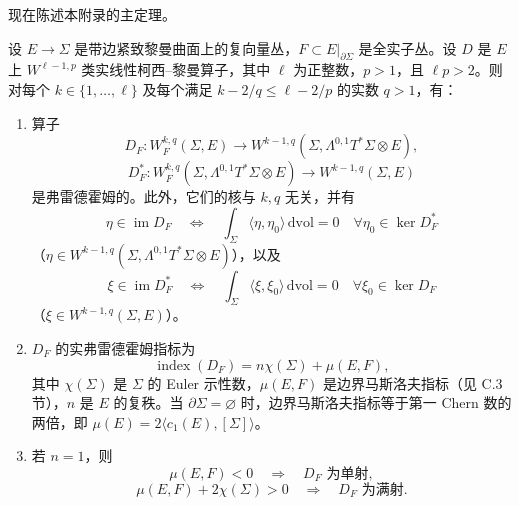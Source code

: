 现在陈述本附录的主定理。

\begin{theorem}[黎曼--罗赫]\label{thm:C-1-10}
设 $E\to\Sigma$ 是带边紧致黎曼曲面上的复向量丛，$F\subset E|_{\partial\Sigma}$ 是全实子丛。设 $D$ 是 $E$ 上 $W^{\ell-1,p}$ 类实线性柯西–黎曼算子，其中 $\ell$ 为正整数，$p>1$，且 $\ell p>2$。则对每个 $k\in\{1,\ldots,\ell\}$ 及每个满足 $k-2/q\le\ell-2/p$ 的实数 $q>1$，有：
\begin{enumerate}[label=(\roman*)]
\item 算子
\[
  D_F:W_F^{k,q}(\Sigma,E)\longrightarrow
  W^{k-1,q}(\Sigma,\Lambda^{0,1}T^*\Sigma\otimes E),
\]
\[
  D_F^*:W_F^{k,q}(\Sigma,\Lambda^{0,1}T^*\Sigma\otimes E)
  \longrightarrow W^{k-1,q}(\Sigma,E)
\]
是弗雷德霍姆的。此外，它们的核与 $k,q$ 无关，并有
\begin{equation}\label{eq:C-1-3}
  \eta\in\operatorname{im}D_F
  \quad\Longleftrightarrow\quad
  \int_\Sigma\langle\eta,\eta_0\rangle\,\mathrm{dvol}=0
  \quad\forall\eta_0\in\ker D_F^*
\end{equation}
（$\eta\in W^{k-1,q}(\Sigma,\Lambda^{0,1}T^*\Sigma\otimes E)$），以及
\begin{equation}\label{eq:C-1-4}
  \xi\in\operatorname{im}D_F^*
  \quad\Longleftrightarrow\quad
  \int_\Sigma\langle\xi,\xi_0\rangle\,\mathrm{dvol}=0
  \quad\forall\xi_0\in\ker D_F
\end{equation}
（$\xi\in W^{k-1,q}(\Sigma,E)$）。
\item $D_F$ 的实弗雷德霍姆指标为
\[
  \operatorname{index}(D_F)=n\chi(\Sigma)+\mu(E,F),
\]
其中 $\chi(\Sigma)$ 是 $\Sigma$ 的 Euler 示性数，$\mu(E,F)$ 是边界马斯洛夫指标（见 C.3 节），$n$ 是 $E$ 的复秩。当 $\partial\Sigma=\varnothing$ 时，边界马斯洛夫指标等于第一 Chern 数的两倍，即 $\mu(E)=2\langle c_1(E),[\Sigma]\rangle$。
\item 若 $n=1$，则
\[
  \mu(E,F)<0\quad\Longrightarrow\quad D_F\text{ 为单射},
\]
\[
  \mu(E,F)+2\chi(\Sigma)>0\quad\Longrightarrow\quad D_F\text{ 为满射}.
\]
\end{enumerate}
\end{theorem}

